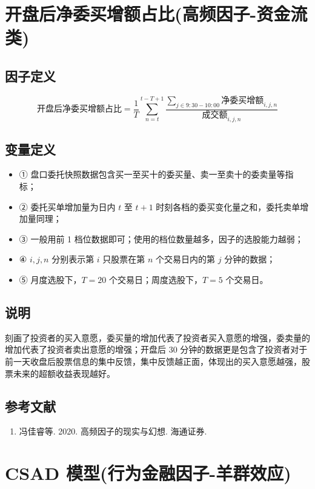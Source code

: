 \documentclass{article}
\begin{document}
\section{开盘后净委买增额占比(高频因子-资金流类)}

\subsection{因子定义}
\begin{equation}
    \text{开盘后净委买增额占比}=\frac{1}{T} \sum_{n=t}^{t-T+1} \frac{\sum_{j \in 9:30-10:00} \text{净委买增额}_{i,j,n}}{ \text{成交额}_{i,j,n}}
\end{equation}

\subsection{变量定义}
\begin{itemize}
    \item ① 盘口委托快照数据包含买一至买十的委买量、卖一至卖十的委卖量等指标；
    \item ② 委托买单增加量为日内 \( t \) 至 \( t+1 \) 时刻各档的委买变化量之和，委托卖单增加量同理；
    \item ③ 一般用前 1 档位数据即可；使用的档位数量越多，因子的选股能力越弱；
    \item ④ \( i, j, n \) 分别表示第 \( i \) 只股票在第 \( n \) 个交易日内的第 \( j \) 分钟的数据；
    \item ⑤ 月度选股下，\( T=20 \) 个交易日；周度选股下，\( T=5 \) 个交易日。
\end{itemize}

\subsection{说明}
刻画了投资者的买入意愿，委买量的增加代表了投资者买入意愿的增强，委卖量的增加代表了投资者卖出意愿的增强；开盘后 30 分钟的数据更是包含了投资者对于前一天收盘后股票信息的集中反馈，集中反馈越正面，体现出的买入意愿越强，股票未来的超额收益表现越好。

\subsection{参考文献}
\begin{enumerate}
    \item 冯佳睿等. 2020. 高频因子的现实与幻想. 海通证券.
\end{enumerate}

\section{CSAD 模型(行为金融因子-羊群效应)}
\end{document}
